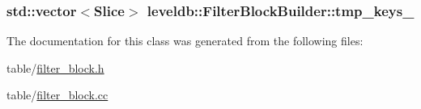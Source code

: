 \subsubsection[{tmp\+\_\+keys\+\_\+}]{\setlength{\rightskip}{0pt plus 5cm}std\+::vector$<${\bf Slice}$>$ leveldb\+::\+Filter\+Block\+Builder\+::tmp\+\_\+keys\+\_\+\hspace{0.3cm}{\ttfamily [private]}}\label{classleveldb_1_1_filter_block_builder_a3f111a41d738802bdd2a6c50892718f5}


The documentation for this class was generated from the following files\+:\begin{DoxyCompactItemize}
\item 
table/\hyperlink{filter__block_8h}{filter\+\_\+block.\+h}\item 
table/\hyperlink{filter__block_8cc}{filter\+\_\+block.\+cc}\end{DoxyCompactItemize}
